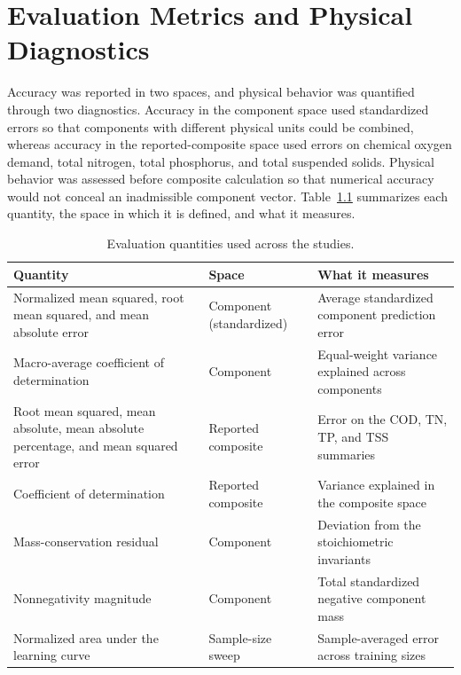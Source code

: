 \documentclass[12pt, twoside]{book}
\begin{document}
\chapter{Evaluation Metrics and Physical Diagnostics}
\label{ch:appendix.c}

Accuracy was reported in two spaces, and physical behavior was quantified through two diagnostics. Accuracy in
the component space used standardized errors so that components with different physical units could be combined,
whereas accuracy in the reported-composite space used errors on chemical oxygen demand, total nitrogen, total
phosphorus, and total suspended solids. Physical behavior was assessed before composite calculation so that
numerical accuracy would not conceal an inadmissible component vector. Table~\ref{tab:appC_metrics} summarizes
each quantity, the space in which it is defined, and what it measures.

\begin{table}[htbp]
\centering
\caption{Evaluation quantities used across the studies.}
\label{tab:appC_metrics}
\small
\setlength{\tabcolsep}{6pt}
\begin{tabular}{p{4.6cm} l p{5.6cm}}
\toprule
Quantity & Space & What it measures \\
\midrule
Normalized mean squared, root mean squared, and mean absolute error & Component (standardized) & Average standardized component prediction error \\
Macro-average coefficient of determination & Component & Equal-weight variance explained across components \\
Root mean squared, mean absolute, mean absolute percentage, and mean squared error & Reported composite & Error on the COD, TN, TP, and TSS summaries \\
Coefficient of determination & Reported composite & Variance explained in the composite space \\
Mass-conservation residual & Component & Deviation from the stoichiometric invariants \\
Nonnegativity magnitude & Component & Total standardized negative component mass \\
Normalized area under the learning curve & Sample-size sweep & Sample-averaged error across training sizes \\
\bottomrule
\end{tabular}
\end{table}
\end{document}
